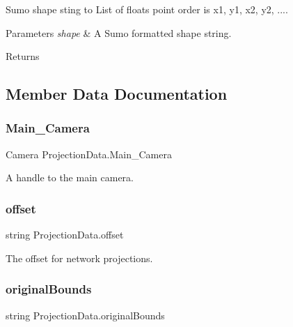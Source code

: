 Sumo shape sting to List of floats point order is x1, y1, x2, y2, .... 


\begin{DoxyParams}{Parameters}
{\em shape} & A Sumo formatted shape string.\\
\hline
\end{DoxyParams}
\begin{DoxyReturn}{Returns}

\end{DoxyReturn}


\subsection{Member Data Documentation}
\mbox{\label{class_projection_data_adbd2a4f3f7ecfcc6bf1acf3e7c959ccb}} 
\subsubsection{\texorpdfstring{Main\_Camera}{Main\_Camera}}
{\footnotesize\ttfamily Camera Projection\+Data.\+Main\+\_\+\+Camera}



A handle to the main camera. 

\mbox{\label{class_projection_data_ace4939a5999be0db36408c5373d2b363}} 
\subsubsection{\texorpdfstring{offset}{offset}}
{\footnotesize\ttfamily string Projection\+Data.\+offset}



The offset for network projections. 

\mbox{\label{class_projection_data_ad006eaf3925882dc6039d65ae17de5c0}} 
\subsubsection{\texorpdfstring{originalBounds}{originalBounds}}
{\footnotesize\ttfamily string Projection\+Data.\+original\+Bounds}



